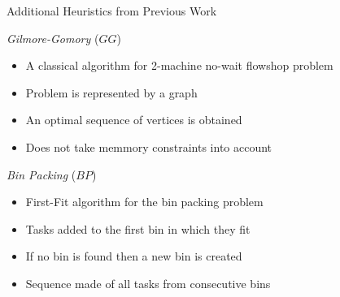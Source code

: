 \documentclass[mathserif,hyperref={pdfpagemode=FullScreen}]{beamer}
\begin{document}
\begin{frame}{Additional Heuristics from Previous Work}
\begin{block}{\textit{Gilmore-Gomory} ($GG$)}
	\begin{itemize}
		\item A classical algorithm for 2-machine no-wait flowshop problem
		\item Problem is represented by a graph
		\item An optimal sequence of vertices is obtained 
		\item Does not take memmory constraints into account
	\end{itemize}
\end{block}


\begin{block}{\textit{Bin Packing} ($BP$)}
	\begin{itemize}
		\item First-Fit algorithm for the bin packing problem
		\item Tasks added to the first bin in which they fit
		\item If no bin is found then a new bin is created
		\item Sequence made of all tasks from consecutive bins
	\end{itemize}
\end{block}
\end{frame}
\end{document}
